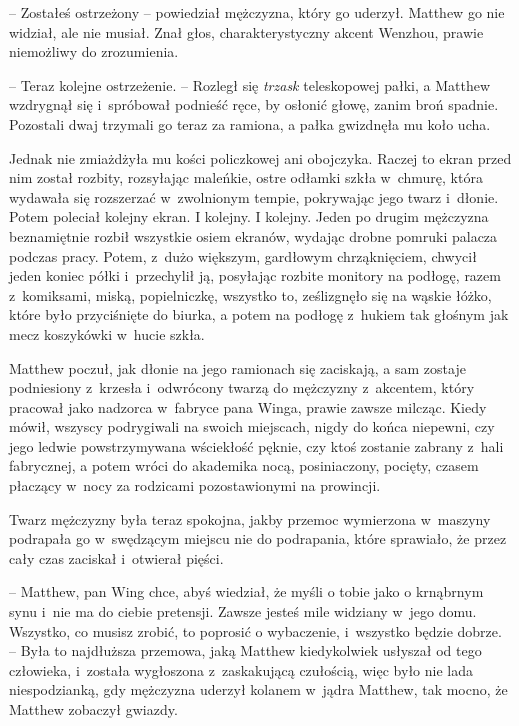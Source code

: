 \documentclass[oneside,polish,11pt,rmheadings]{mwbk}
\begin{document}
-- Zostałeś ostrzeżony -- powiedział mężczyzna, który go uderzył. Matthew go nie widział, ale nie musiał. Znał głos, charakterystyczny akcent Wenzhou, prawie niemożliwy do zrozumienia. 

-- Teraz kolejne ostrzeżenie. -- Rozległ się \textit{trzask }teleskopowej pałki, a Matthew wzdrygnął się i~spróbował podnieść ręce, by osłonić głowę, zanim broń spadnie. Pozostali dwaj trzymali go teraz za ramiona, a pałka gwizdnęła mu koło ucha. 


Jednak nie zmiażdżyła mu kości policzkowej ani obojczyka. Raczej to ekran przed nim został rozbity, rozsyłając maleńkie, ostre odłamki szkła w~chmurę, która wydawała się rozszerzać w~zwolnionym tempie, pokrywając jego twarz i~dłonie. Potem poleciał kolejny ekran. I kolejny. I kolejny. Jeden po drugim mężczyzna beznamiętnie rozbił wszystkie osiem ekranów, wydając drobne pomruki palacza podczas pracy. Potem, z~dużo większym, gardłowym chrząknięciem, chwycił jeden koniec półki i~przechylił ją, posyłając rozbite monitory na podłogę, razem z~komiksami, miską, popielniczkę, wszystko to, ześlizgnęło się na wąskie łóżko, które było przyciśnięte do biurka, a potem na podłogę z~hukiem tak głośnym jak mecz koszykówki w~hucie szkła. 


Matthew poczuł, jak dłonie na jego ramionach się zaciskają, a sam zostaje podniesiony z~krzesła i~odwrócony twarzą do mężczyzny z~akcentem, który pracował jako nadzorca w~fabryce pana Winga, prawie zawsze milcząc. Kiedy mówił, wszyscy podrygiwali na swoich miejscach, nigdy do końca niepewni, czy jego ledwie powstrzymywana wściekłość pęknie, czy ktoś zostanie zabrany z~hali fabrycznej, a potem wróci do akademika nocą, posiniaczony, pocięty, czasem płaczący w~nocy za rodzicami pozostawionymi na prowincji. 


Twarz mężczyzny była teraz spokojna, jakby przemoc wymierzona w~maszyny podrapała go w~swędzącym miejscu nie do podrapania, które sprawiało, że przez cały czas zaciskał i~otwierał pięści. 

-- Matthew, pan Wing chce, abyś wiedział, że myśli o tobie jako o krnąbrnym synu i~nie ma do ciebie pretensji. Zawsze jesteś mile widziany w~jego domu. Wszystko, co musisz zrobić, to poprosić o wybaczenie, i~wszystko będzie dobrze. -- Była to najdłuższa przemowa, jaką Matthew kiedykolwiek usłyszał od tego człowieka, i~została wygłoszona z~zaskakującą czułością, więc było nie lada niespodzianką, gdy mężczyzna uderzył kolanem w~jądra Matthew, tak mocno, że Matthew zobaczył gwiazdy. 
\end{document}
